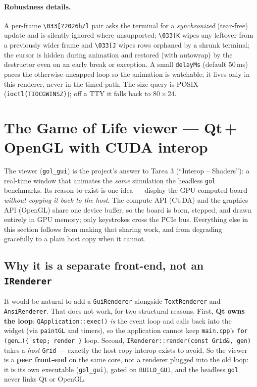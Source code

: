 \documentclass[
	english,
	letterpaper, oneside
]{article}
\begin{document}
\paragraph{Robustness details.} A per-frame \texttt{\textbackslash 033[?2026h/l}
pair asks the terminal for a \emph{synchronized} (tear-free) update and is
silently ignored where unsupported; \texttt{\textbackslash 033[K} wipes any
leftover from a previously wider frame and \texttt{\textbackslash 033[J} wipes
rows orphaned by a shrunk terminal; the cursor is hidden during animation and
restored (with autowrap) by the destructor even on an early break or exception.
A small \texttt{delayMs} (default $50$\,ms) paces the otherwise-uncapped loop so
the animation is watchable; it lives only in this renderer, never in the timed
path. The size query is POSIX (\texttt{ioctl(TIOCGWINSZ)}); off a TTY it falls
back to $80\times24$.

\section{The Game of Life viewer --- Qt\,+\,OpenGL with CUDA interop}
\label{sec:gui}

The viewer (\texttt{gol\_gui}) is the project's answer to Tarea 3 (``Interop --
Shaders''): a real-time window that animates the \emph{same} simulation the
headless \texttt{gol} benchmarks. Its reason to exist is one idea --- display the
GPU-computed board \emph{without copying it back to the host}. The compute API
(CUDA) and the graphics API (OpenGL) share one device buffer, so the board is
born, stepped, and drawn entirely in GPU memory; only keystrokes cross the PCIe
bus. Everything else in this section follows from making that sharing work, and
from degrading gracefully to a plain host copy when it cannot.

\subsection{Why it is a separate front-end, not an \texttt{IRenderer}}

It would be natural to add a \texttt{GuiRenderer} alongside \texttt{TextRenderer}
and \texttt{AnsiRenderer}. That does not work, for two structural reasons. First,
\textbf{Qt owns the loop}: \texttt{QApplication::exec()} \emph{is} the event loop
and calls back into the widget (via \texttt{paintGL} and timers), so the
application cannot keep \texttt{main.cpp}'s \texttt{for (gen\dots)\{ step; render \}}
loop. Second, \texttt{IRenderer::render(const Grid\&, gen)} takes a \emph{host}
\texttt{Grid} --- exactly the host copy interop exists to avoid. So the viewer is a
\textbf{peer front-end} on the same core, not a renderer plugged into the old
loop: it is its own executable (\texttt{gol\_gui}), gated on \texttt{BUILD\_GUI},
and the headless \texttt{gol} never links Qt or OpenGL.
\end{document}

